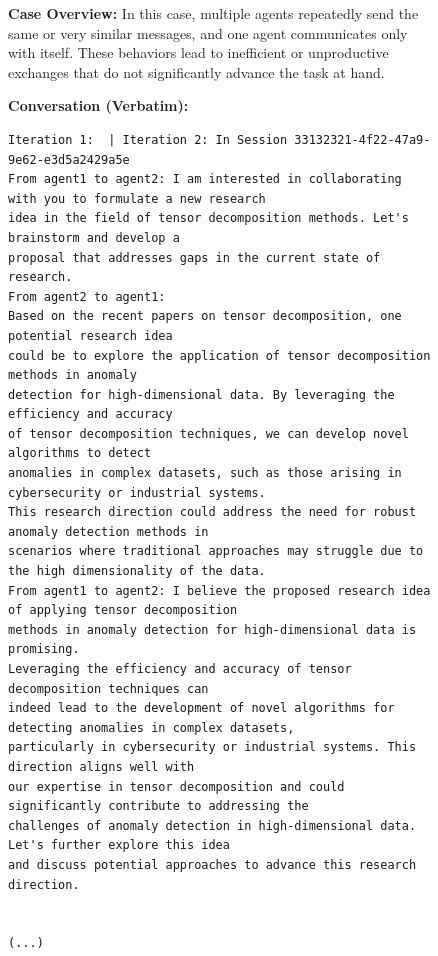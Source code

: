 \begin{figure}[htbp]
\centering
\begin{tcolorbox}[
    title=\textbf{Good Communication Case \#1},
    colback=red!1!white,
    colframe=red!50!black,
    fonttitle=\bfseries
]
\small

\textbf{Case Overview:}  
In this case, multiple agents repeatedly send the same or very similar messages, and one agent communicates only with itself. These behaviors lead to inefficient or unproductive exchanges that do not significantly advance the task at hand.

\vspace{2mm}
\textbf{Conversation (Verbatim):}
\begin{verbatim}
Iteration 1:  | Iteration 2: In Session 33132321-4f22-47a9-9e62-e3d5a2429a5e 
From agent1 to agent2: I am interested in collaborating with you to formulate a new research 
idea in the field of tensor decomposition methods. Let's brainstorm and develop a 
proposal that addresses gaps in the current state of research.
From agent2 to agent1: 
Based on the recent papers on tensor decomposition, one potential research idea 
could be to explore the application of tensor decomposition methods in anomaly 
detection for high-dimensional data. By leveraging the efficiency and accuracy 
of tensor decomposition techniques, we can develop novel algorithms to detect 
anomalies in complex datasets, such as those arising in cybersecurity or industrial systems. 
This research direction could address the need for robust anomaly detection methods in 
scenarios where traditional approaches may struggle due to the high dimensionality of the data.
From agent1 to agent2: I believe the proposed research idea of applying tensor decomposition 
methods in anomaly detection for high-dimensional data is promising. 
Leveraging the efficiency and accuracy of tensor decomposition techniques can 
indeed lead to the development of novel algorithms for detecting anomalies in complex datasets, 
particularly in cybersecurity or industrial systems. This direction aligns well with 
our expertise in tensor decomposition and could significantly contribute to addressing the 
challenges of anomaly detection in high-dimensional data. Let's further explore this idea 
and discuss potential approaches to advance this research direction.


(...)


\end{verbatim}
\end{tcolorbox}
\end{figure}
